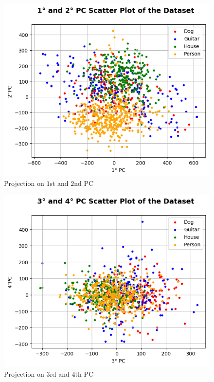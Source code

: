 \documentclass[a4paper, 11pt]{article}
\begin{document}
	\begin{figure}[ht!]
		\centering
		\includegraphics[height=0.5\paperwidth]{img/fig02a.png}
		\caption{Projection on $1$st and $2$nd PC}
		\label{fig:scatter1}
	\end{figure}
	\begin{figure}[ht!]
		\centering
		\includegraphics[height=0.5\paperwidth]{img/fig02b.png}
		\caption{Projection on $3$rd and $4$th PC}
		\label{fig:scatter2}
	\end{figure}
\end{document}
